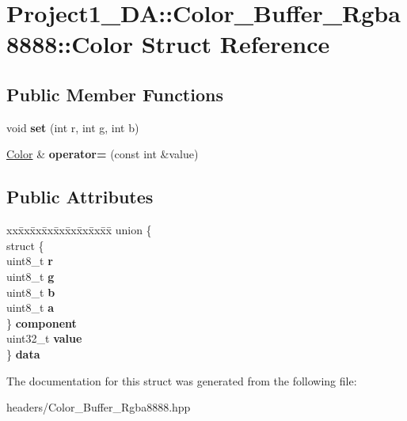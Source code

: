 \hypertarget{struct_project1__3_d_a_1_1_color___buffer___rgba8888_1_1_color}{}\section{Project1\+\_\+DA\+::Color\+\_\+\+Buffer\+\_\+\+Rgba8888\+::Color Struct Reference}
\label{struct_project1__3_d_a_1_1_color___buffer___rgba8888_1_1_color}
\subsection*{Public Member Functions}
\begin{DoxyCompactItemize}
\item 
\mbox{\label{struct_project1__3_d_a_1_1_color___buffer___rgba8888_1_1_color_a8e4dcf22c56694aecb02d1d9fb8b4d59}} 
void {\bfseries set} (int r, int g, int b)
\item 
\mbox{\label{struct_project1__3_d_a_1_1_color___buffer___rgba8888_1_1_color_a150c6064c8d48ff5e339cd896c994e96}} 
\mbox{\hyperlink{struct_project1__3_d_a_1_1_color___buffer___rgba8888_1_1_color}{Color}} \& {\bfseries operator=} (const int \&value)
\end{DoxyCompactItemize}
\subsection*{Public Attributes}
\begin{DoxyCompactItemize}
\item 
\mbox{\label{struct_project1__3_d_a_1_1_color___buffer___rgba8888_1_1_color_a989252ebb4b557ad15bf74310fddc984}} 
\begin{tabbing}
xx\=xx\=xx\=xx\=xx\=xx\=xx\=xx\=xx\=\kill
union \{\\
\>struct \{\\
\>\>uint8\_t {\bfseries r}\\
\>\>uint8\_t {\bfseries g}\\
\>\>uint8\_t {\bfseries b}\\
\>\>uint8\_t {\bfseries a}\\
\>\} {\bfseries component}\\
\>uint32\_t {\bfseries value}\\
\} {\bfseries data}\\

\end{tabbing}\end{DoxyCompactItemize}


The documentation for this struct was generated from the following file\+:\begin{DoxyCompactItemize}
\item 
headers/Color\+\_\+\+Buffer\+\_\+\+Rgba8888.\+hpp\end{DoxyCompactItemize}

